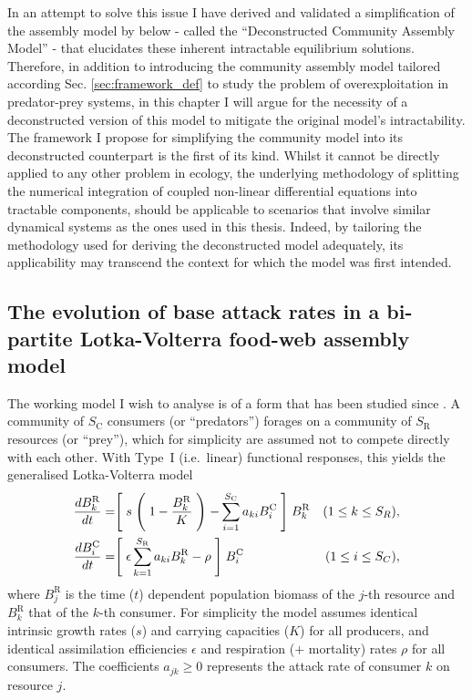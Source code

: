 \documentclass[a4paper]{report}
\begin{document}
 In an attempt to solve this issue I have derived and validated a simplification of the assembly model by \citep{Rossberg2013} below - called the ``Deconstructed Community Assembly Model'' - that elucidates these inherent intractable equilibrium solutions. Therefore, in addition to introducing the community assembly model tailored according Sec. \ref{sec:framework_def} to study the problem of overexploitation in predator-prey systems, in this chapter I will argue for the necessity of a deconstructed version of this model to mitigate the original model's intractability. The framework I propose for simplifying the community model into its deconstructed counterpart is the first of its kind. Whilst it cannot be directly applied to any other problem in ecology, the underlying methodology of splitting the numerical integration of coupled non-linear differential equations into tractable components, should be applicable to scenarios that involve similar dynamical systems as the ones used in this thesis. Indeed, by tailoring the methodology used for deriving the deconstructed model adequately, its applicability may transcend the context for which the model was first intended. \\


 
\subsection{The evolution of base attack rates in a bi-partite Lotka-Volterra food-web assembly model \label{sec:model_definition}}  

The working model I wish to analyse is of a form that has been studied since
\citep{macarthur69:_species_packing_optimization}.  A community of
$S_{\mathrm{\mathrm{C}}}$ consumers (or ``predators'') forages on a community
of $S_{\mathrm{R}}$ resources (or ``prey''), which for simplicity
are assumed not to compete directly with each other. With Type~I
(i.e.~linear) functional responses, this yields the generalised
Lotka-Volterra model
\begin{subequations}
  \label{eq:LV1}
  \begin{align}
    \frac{dB_{k}^{\mathrm{R}}}{dt}&=\Biggm[s\Biggm(1-\frac{B_{k}^{\mathrm{R}}}{K}\Biggm)-\sum_{i=1}^{S_{\mathrm{C}}}a_{ki}B_{i}^{\mathrm{C}}\Biggm]B_{k}^{\mathrm{R}}&(1\le k \le S_R)\label{eq:LV_consumer1},\\
    \frac{dB_{i}^{\mathrm{C}}}{dt}&=\Biggm[\epsilon\sum_{k=1}^{S_{\mathrm{R}}}a_{ki}B_{k}^{\mathrm{R}}-\rho\Biggm]B_{i}^{\mathrm{C}}&(1\le i \le S_C),\label{eq:LV_resource1}
  \end{align}
\end{subequations}
where $B_{j}^{\mathrm{R}}$ is the time ($t$) dependent population
biomass of the $j$-th resource and $B_{k}^{\mathrm{R}}$ that of the
$k$-th consumer. For simplicity the model assumes identical intrinsic
growth rates ($s$) and carrying capacities ($K$) for all producers, and
identical assimilation efficiencies $\epsilon$ and respiration ($+$
mortality) rates $\rho$ for all consumers.  The coefficients
$a_{jk}\ge 0$ represents the attack rate of consumer $k$ on resource
$j$.\\
\end{document}
